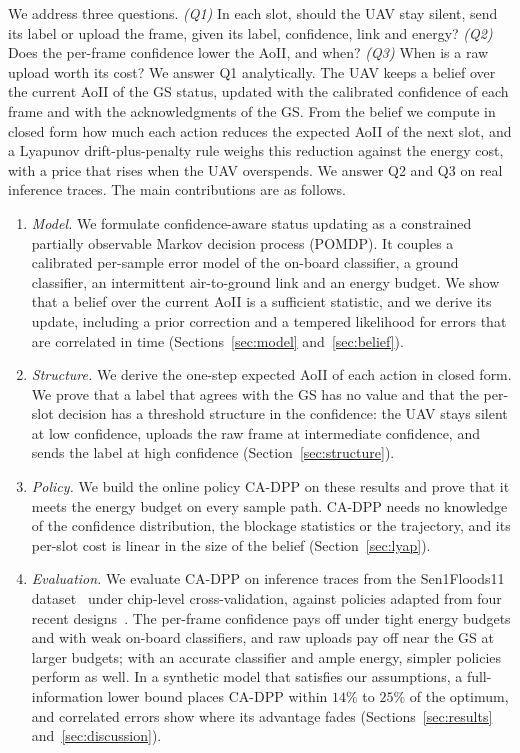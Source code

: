 \documentclass[5p,twocolumn]{elsarticle}
\theoremstyle{remark}
\begin{document}
We address three questions. \emph{(Q1)} In each slot, should the UAV stay silent, send its label or upload the frame, given its label, confidence, link and energy? \emph{(Q2)} Does the per-frame confidence lower the AoII, and when? \emph{(Q3)} When is a raw upload worth its cost? We answer Q1 analytically. The UAV keeps a belief over the current AoII of the GS status, updated with the calibrated confidence of each frame and with the acknowledgments of the GS. From the belief we compute in closed form how much each action reduces the expected AoII of the next slot, and a Lyapunov drift-plus-penalty rule weighs this reduction against the energy cost, with a price that rises when the UAV overspends. We answer Q2 and Q3 on real inference traces. The main contributions are as follows.
\begin{enumerate}
\item \emph{Model.} We formulate confidence-aware status updating as a constrained partially observable Markov decision process (POMDP). It couples a calibrated per-sample error model of the on-board classifier, a ground classifier, an intermittent air-to-ground link and an energy budget. We show that a belief over the current AoII is a sufficient statistic, and we derive its update, including a prior correction and a tempered likelihood for errors that are correlated in time (Sections~\ref{sec:model} and~\ref{sec:belief}).
\item \emph{Structure.} We derive the one-step expected AoII of each action in closed form. We prove that a label that agrees with the GS has no value and that the per-slot decision has a threshold structure in the confidence: the UAV stays silent at low confidence, uploads the raw frame at intermediate confidence, and sends the label at high confidence (Section~\ref{sec:structure}).
\item \emph{Policy.} We build the online policy CA-DPP on these results and prove that it meets the energy budget on every sample path. CA-DPP needs no knowledge of the confidence distribution, the blockage statistics or the trajectory, and its per-slot cost is linear in the size of the belief (Section~\ref{sec:lyap}).
\item \emph{Evaluation.} We evaluate CA-DPP on inference traces from the Sen1Floods11 dataset~\cite{bonafilia2020sen1floods11} under chip-level cross-validation, against policies adapted from four recent designs~\cite{zakeri2023aoiieh,gan2025taoi,pehlivanoglu2026orbit,basnayaka2025aomi}. The per-frame confidence pays off under tight energy budgets and with weak on-board classifiers, and raw uploads pay off near the GS at larger budgets; with an accurate classifier and ample energy, simpler policies perform as well. In a synthetic model that satisfies our assumptions, a full-information lower bound places CA-DPP within $14\%$ to $25\%$ of the optimum, and correlated errors show where its advantage fades (Sections~\ref{sec:results} and~\ref{sec:discussion}).
\end{enumerate}
\end{document}
